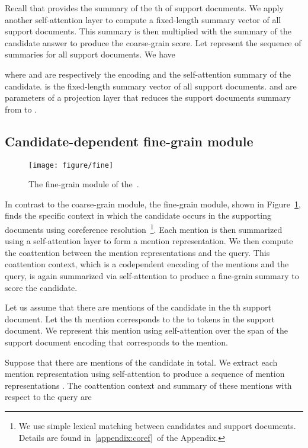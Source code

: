 \documentclass{article} \usepackage{iclr2019_conference,times}
\begin{document}
Recall that  provides the summary of the th of  support documents.
We apply another self-attention layer to compute a fixed-length summary vector of all support documents.
This summary is then multiplied with the summary of the candidate answer to produce the coarse-grain score.
Let  represent the sequence of summaries for all support documents.
We have



where  and  are respectively the encoding and the self-attention summary of the candidate.
 is the fixed-length summary vector of all support documents.
 and  are parameters of a projection layer that reduces the support documents summary from  to .




\subsection{Candidate-dependent fine-grain module}

\begin{figure}[t]
    \centering
    \texttt{[image: figure/fine]}
    \caption{The fine-grain module of the~\modelnameshort.}
    \label{fig:fine}
    \vspace{-0.5cm}
\end{figure}

In contrast to the coarse-grain module, the fine-grain module, shown in Figure~\ref{fig:fine}, finds the specific context in which the candidate occurs in the supporting documents using coreference resolution~\footnote{We use simple lexical matching between candidates and support documents. Details are found in~\ref{appendix:coref}~of the Appendix.}.
Each mention is then summarized using a self-attention layer to form a mention representation.
We then compute the coattention between the mention representations and the query.
This coattention context, which is a codependent encoding of the mentions and the query, is again summarized via self-attention to produce a fine-grain summary to score the candidate.



 

Let us assume that there are  mentions of the candidate in the th support document.
Let the th mention corresponds to the  to  tokens in the support document.
We represent this mention using self-attention over the span of the support document encoding that corresponds to the mention. 

{}

Suppose that there are  mentions of the candidate in total.
We extract each mention representation using self-attention to produce a sequence of mention representations .
The coattention context and summary of these mentions  with respect to the query  are
\end{document}
